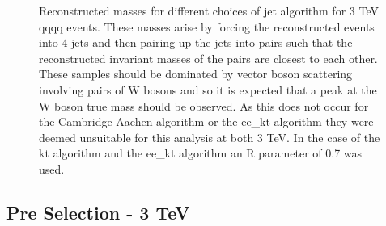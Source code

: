 \begin{figure}
\centering
{}
\caption[Reconstructed invariant masses for different choices of jet algorithm for 3 TeV \nu{\nu}qqqq events.]{Reconstructed masses for different choices of jet algorithm for 3 TeV \nu{\nu}qqqq events. These masses arise by forcing the reconstructed events into 4 jets and then pairing up the jets into pairs such that the reconstructed invariant masses of the pairs are closest to each other. These samples should be dominated by vector boson scattering involving pairs of W bosons and so it is expected that a peak at the W boson true mass should be observed. As this does not occur for the Cambridge-Aachen algorithm or the ee\_kt algorithm they were deemed unsuitable for this analysis at both 3 TeV. In the case of the kt algorithm and the ee\_kt algorithm an R parameter of 0.7 was used.}
\label{fig:invariantmassalgoveto}
\end{figure}

\subsection{Pre Selection - 3 TeV}

